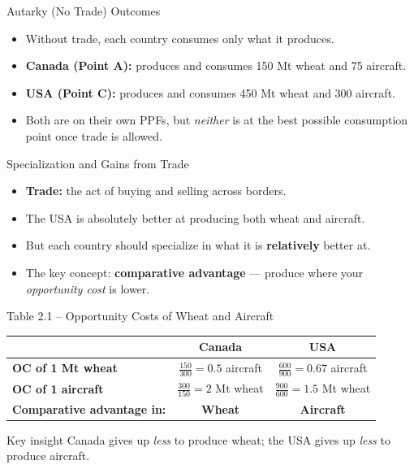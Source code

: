 \documentclass[aspectratio=169]{beamer}
\begin{document}
\begin{frame}{Autarky (No Trade) Outcomes}
\transfade
\begin{itemize}
  \item Without trade, each country consumes only what it produces.
  \item \textbf{Canada (Point A):} produces and consumes 150 Mt wheat and 75 aircraft.
  \item \textbf{USA (Point C):} produces and consumes 450 Mt wheat and 300 aircraft.
  \item Both are on their own PPFs, but \emph{neither} is at the best possible consumption point once trade is allowed.
\end{itemize}
\end{frame}

\begin{frame}{Specialization and Gains from Trade}
\transfade
\begin{itemize}
  \item \textbf{Trade:} the act of buying and selling across borders.
  \item The USA is absolutely better at producing both wheat and aircraft.
  \item But each country should specialize in what it is \textbf{relatively} better at.
  \item The key concept: \textbf{comparative advantage} --- produce where your \emph{opportunity cost} is lower.
\end{itemize}
\end{frame}

\begin{frame}{Table 2.1 -- Opportunity Costs of Wheat and Aircraft}
\begin{center}
\renewcommand{\arraystretch}{1.6}
\begin{tabular}{lcc}
\toprule
 & \textbf{\color{accent}Canada} & \textbf{\color{canadared}USA} \\
\midrule
\textbf{OC of 1 Mt wheat} & $\tfrac{150}{300}=0.5$ aircraft & $\tfrac{600}{900}=0.67$ aircraft \\
\textbf{OC of 1 aircraft} & $\tfrac{300}{150}=2$ Mt wheat & $\tfrac{900}{600}=1.5$ Mt wheat \\
\midrule
\textbf{Comparative advantage in:} & \textcolor{ppfblue}{\textbf{Wheat}} & \textcolor{canadared}{\textbf{Aircraft}} \\
\bottomrule
\end{tabular}
\end{center}
\vspace{0.5em}
\begin{block}{Key insight}
Canada gives up \emph{less} to produce wheat; the USA gives up \emph{less} to produce aircraft.
\end{block}
\end{frame}
\end{document}
